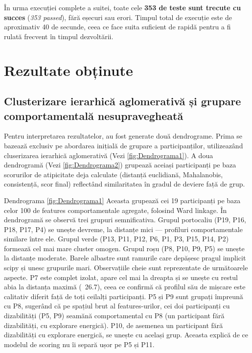 \documentclass[12pt,a4paper]{report}
\theoremstyle{definition}
\theoremstyle{remark}
\begin{document}
În urma execuției complete a suitei, toate cele \textbf{353 de teste sunt
trecute cu succes} (\emph{353 passed}), fără eșecuri sau erori. Timpul total de
execuție este de aproximativ 40 de secunde, ceea ce face suita suficient de
rapidă pentru a fi rulată frecvent în timpul dezvoltării.




\chapter{Rezultate obținute}

\section{Clusterizare ierarhică aglomerativă și grupare comportamentală nesupravegheată}

Pentru interpretarea rezultatelor, au fost generate două dendrograme. Prima se bazează exclusiv pe abordarea inițială de grupare a participanților, utilizeazând cluserizarea ierarhică aglomerativă (Vezi \ref{fig:Dendrograma1}). A doua dendrogramă (Vezi \ref{fig:Dendrograma2}) grupează aceiași participanți pe baza scorurilor de atipicitate deja calculate (distanță euclidiană, Mahalanobis, consistență, scor final) reflectând similaritatea în gradul de deviere față de grup. 

Dendrograma \ref{fig:Dendrograma1} Aceasta grupează cei 19 participanți pe baza celor 100 de features comportamentale agregate, folosind Ward linkage. În dendrogramă se observă trei grupuri semnificativa. Grupul portocaliu (P19, P16, P18, P17, P4) se unește devreme, la distanțe mici — profiluri comportamentale similare între ele. Grupul verde (P13, P11, P12, P6, P1, P3, P15, P14, P2) formează cel mai mare cluster omogen. Grupul roșu (P8, P10, P9, P5) se unește la distanțe moderate. Barele albastre sunt ramurile care depășesc pragul implicit scipy și unesc grupurile mari. Observațiile cheie sunt reprezentate de următoarele aspecte. P7 este complet izolat, apare cel mai la dreapta și se unește cu restul abia la distanța maximă (~26.7), ceea ce confirmă că profilul său de mișcare este calitativ diferit față de toți ceilalți participanți. P5 și P9 sunt grupați împreună cu P8, sugerând că pe spațiul brut al features-urilor, cei doi participanți cu dizabilități (P5, P9) seamănă comportamental cu P8 (un participant fără dizabilități, cu explorare energică). P10, de asemenea un participant fără dizabilități cu explorare energică, se unește cu același grup. Aceasta explică de ce modelul de scoring nu îi separă ușor pe P5 și P11.
\end{document}
